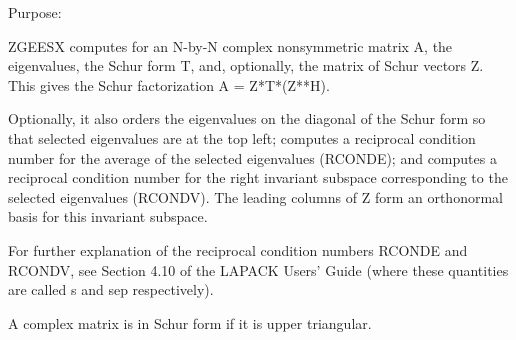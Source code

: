  \begin{DoxyParagraph}{Purpose\+: }
\begin{DoxyVerb} ZGEESX computes for an N-by-N complex nonsymmetric matrix A, the
 eigenvalues, the Schur form T, and, optionally, the matrix of Schur
 vectors Z.  This gives the Schur factorization A = Z*T*(Z**H).

 Optionally, it also orders the eigenvalues on the diagonal of the
 Schur form so that selected eigenvalues are at the top left;
 computes a reciprocal condition number for the average of the
 selected eigenvalues (RCONDE); and computes a reciprocal condition
 number for the right invariant subspace corresponding to the
 selected eigenvalues (RCONDV).  The leading columns of Z form an
 orthonormal basis for this invariant subspace.

 For further explanation of the reciprocal condition numbers RCONDE
 and RCONDV, see Section 4.10 of the LAPACK Users' Guide (where
 these quantities are called s and sep respectively).

 A complex matrix is in Schur form if it is upper triangular.\end{DoxyVerb}
 
\end{DoxyParagraph}

